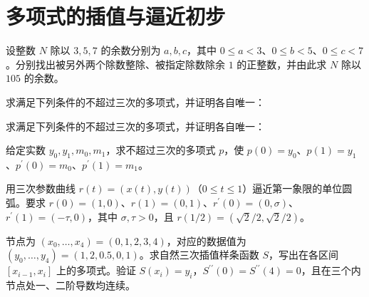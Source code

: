 \renewcommand{\thesection}{\Alph{section}}\renewcommand{\theHsection}{appendix.\Alph{section}}\setcounter{section}{0}\section{多项式的插值与逼近初步}
\noindent\begin{minipage}{\textwidth}
设整数 $N$ 除以 $3,5,7$ 的余数分别为 $a,b,c$，其中 $0\le a<3$、$0\le b<5$、$0\le c<7$。分别找出被另外两个除数整除、被指定除数除余 $1$ 的正整数，并由此求 $N$ 除以 $105$ 的余数。
\end{minipage}\par\vfill
\noindent\begin{minipage}{\textwidth}
求满足下列条件的不超过三次的多项式，并证明各自唯一：
\end{minipage}\par\vfill
\noindent\begin{minipage}{\textwidth}
求满足下列条件的不超过三次的多项式，并证明各自唯一：
\end{minipage}\par\vfill
\newpage
\noindent\begin{minipage}{\textwidth}
给定实数 $y_0,y_1,m_0,m_1$，求不超过三次的多项式 $p$，使 $p(0)=y_0$、$p(1)=y_1$、$p^{\prime}(0)=m_0$、$p^{\prime}(1)=m_1$。
\end{minipage}\par\vfill
\noindent\begin{minipage}{\textwidth}
用三次参数曲线 $r(t)=(x(t),y(t))$（$0\le t\le1$）逼近第一象限的单位圆弧。要求 $r(0)=(1,0)$、$r(1)=(0,1)$、$r^{\prime}(0)=(0,\sigma)$、$r^{\prime}(1)=(-\tau,0)$，其中 $\sigma,\tau>0$，且 $r(1/2)=(\sqrt2/2,\sqrt2/2)$。
\end{minipage}\par\vfill
\noindent\begin{minipage}{\textwidth}
节点为 $(x_0,\ldots,x_4)=(0,1,2,3,4)$，对应的数据值为 $(y_0,\ldots,y_4)=(1,2,0.5,0,1)$。求自然三次插值样条函数 $S$，写出在各区间 $[x_{i-1},x_i]$ 上的多项式。验证 $S(x_i)=y_i$，$S^{\prime\prime}(0)=S^{\prime\prime}(4)=0$，且在三个内节点处一、二阶导数均连续。
\end{minipage}\par\vfill
